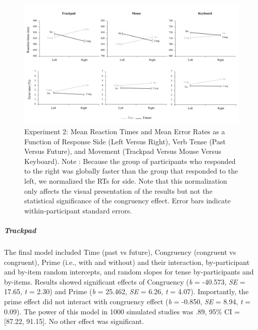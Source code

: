 \documentclass[
  a4paper,12pt,twoside,onecolumn,openright,final,oldfontcommands]{memoir}
\begin{document}
\begin{landscape}

\begin{figure}[htbp!]

{\centering \includegraphics[width=0.9\linewidth]{figures/chap-3-fig4} 

}

\caption{Experiment 2: Mean Reaction Times and Mean Error Rates as a Function of Response Side (Left Versus Right), Verb Tense (Past Versus Future), and Movement (Trackpad Versus Mouse Versus Keyboard). Note : Because the group of participants who responded to the right was globally faster than the group that responded to the left, we normalized the RTs for side. Note that this normalization only affects the visual presentation of the results but not the statistical significance of the congruency effect. Error bars indicate within-participant standard errors.}\label{fig:chap-3-fig4}
\end{figure}

\end{landscape}

\hypertarget{trackpad}{%
\subparagraph{Trackpad}\label{trackpad}}

The final model included Time (past vs future), Congruency (congruent vs congruent), Prime (i.e., with and without) and their interaction, by-participant and by-item random intercepts, and random slopes for tense by-participants and by-items. Results showed significant effects of Congruency (\emph{b} = -40.573, \emph{SE} = 17.65, \emph{t} = 2.30) and Prime (\emph{b} = 25.462, \emph{SE} = 6.26, \emph{t} = 4.07). Importantly, the prime effect did not interact with congruency effect (\emph{b} = -0.850, \emph{SE} = 8.94, \emph{t} = 0.09). The power of this model in 1000 simulated studies was .89, 95\% CI = {[}87.22, 91.15{]}. No other effect was significant.
\end{document}

